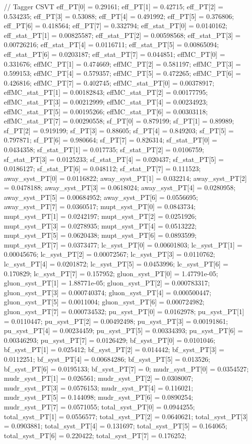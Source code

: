 // Tagger CSVT
eff_PT[0] = 0.29161; eff_PT[1] = 0.42715; eff_PT[2] = 0.534235; 
eff_PT[3] = 0.53088; eff_PT[4] = 0.491992; eff_PT[5] = 0.376806; 
eff_PT[6] = 0.418564; eff_PT[7] = 0.332794; 
eff_stat_PT[0] = 0.0140162; eff_stat_PT[1] = 0.00825587; eff_stat_PT[2] = 0.00598568; 
eff_stat_PT[3] = 0.00726216; eff_stat_PT[4] = 0.0116711; eff_stat_PT[5] = 0.00865094; 
eff_stat_PT[6] = 0.0203187; eff_stat_PT[7] = 0.044851; 
effMC_PT[0] = 0.331676; effMC_PT[1] = 0.474669; effMC_PT[2] = 0.581197; 
effMC_PT[3] = 0.599153; effMC_PT[4] = 0.579357; effMC_PT[5] = 0.472265; 
effMC_PT[6] = 0.426816; effMC_PT[7] = 0.402745; 
effMC_stat_PT[0] = 0.00378917; effMC_stat_PT[1] = 0.00182843; effMC_stat_PT[2] = 0.00177795; 
effMC_stat_PT[3] = 0.00212999; effMC_stat_PT[4] = 0.00234923; effMC_stat_PT[5] = 0.00195266; 
effMC_stat_PT[6] = 0.00303118; effMC_stat_PT[7] = 0.00290558; 
sf_PT[0] = 0.879199; sf_PT[1] = 0.89989; sf_PT[2] = 0.919199; 
sf_PT[3] = 0.88605; sf_PT[4] = 0.849203; sf_PT[5] = 0.797871; 
sf_PT[6] = 0.980664; sf_PT[7] = 0.826314; 
sf_stat_PT[0] = 0.0434358; sf_stat_PT[1] = 0.017735; sf_stat_PT[2] = 0.0106759; 
sf_stat_PT[3] = 0.0125233; sf_stat_PT[4] = 0.020437; sf_stat_PT[5] = 0.0186127; 
sf_stat_PT[6] = 0.048112; sf_stat_PT[7] = 0.111523; 
away_syst_PT[0] = 0.0116822; away_syst_PT[1] = 0.032214; away_syst_PT[2] = 0.0478188; 
away_syst_PT[3] = 0.0618024; away_syst_PT[4] = 0.0280958; away_syst_PT[5] = 0.00684952; 
away_syst_PT[6] = 0.0556695; away_syst_PT[7] = 0.0360517; 
mupt_syst_PT[0] = 0.0843734; mupt_syst_PT[1] = 0.0242197; mupt_syst_PT[2] = 0.0251926; 
mupt_syst_PT[3] = 0.0278935; mupt_syst_PT[4] = 0.0513222; mupt_syst_PT[5] = 0.0620438; 
mupt_syst_PT[6] = 0.0893599; mupt_syst_PT[7] = 0.0373477; 
lc_syst_PT[0] = 0.00601803; lc_syst_PT[1] = 0.00045676; lc_syst_PT[2] = 0.00072567; 
lc_syst_PT[3] = 0.0110762; lc_syst_PT[4] = 0.0201872; lc_syst_PT[5] = 0.0453996; 
lc_syst_PT[6] = 0.170829; lc_syst_PT[7] = 0.157952; 
gluon_syst_PT[0] = 1.47791e-05; gluon_syst_PT[1] = 1.88771e-05; gluon_syst_PT[2] = 0.000783317; 
gluon_syst_PT[3] = 0.000740374; gluon_syst_PT[4] = 0.000500447; gluon_syst_PT[5] = 0.0011004; 
gluon_syst_PT[6] = 0.000724982; gluon_syst_PT[7] = 0.000734532; 
pu_syst_PT[0] = 0.0162978; pu_syst_PT[1] = 0.0110447; pu_syst_PT[2] = 0.00492498; 
pu_syst_PT[3] = 0.00191861; pu_syst_PT[4] = 0.00234459; pu_syst_PT[5] = 0.00334393; 
pu_syst_PT[6] = 0.00346293; pu_syst_PT[7] = 0.0126429; 
bf_syst_PT[0] = 0.0101046; bf_syst_PT[1] = 0.025412; bf_syst_PT[2] = 0.014442; 
bf_syst_PT[3] = 0.0112251; bf_syst_PT[4] = 0.00684286; bf_syst_PT[5] = 0.013526; 
bf_syst_PT[6] = 0.0195133; bf_syst_PT[7] = 0; 
mudr_syst_PT[0] = 0.0354527; mudr_syst_PT[1] = 0.026561; mudr_syst_PT[2] = 0.0308007; 
mudr_syst_PT[3] = 0.0576153; mudr_syst_PT[4] = 0.116021; mudr_syst_PT[5] = 0.144098; 
mudr_syst_PT[6] = 0.0890254; mudr_syst_PT[7] = 0.0571055; 
total_syst_PT[0] = 0.0944255; total_syst_PT[1] = 0.0556577; total_syst_PT[2] = 0.0640621; 
total_syst_PT[3] = 0.0903881; total_syst_PT[4] = 0.131697; total_syst_PT[5] = 0.164065; 
total_syst_PT[6] = 0.220422; total_syst_PT[7] = 0.176252; 



